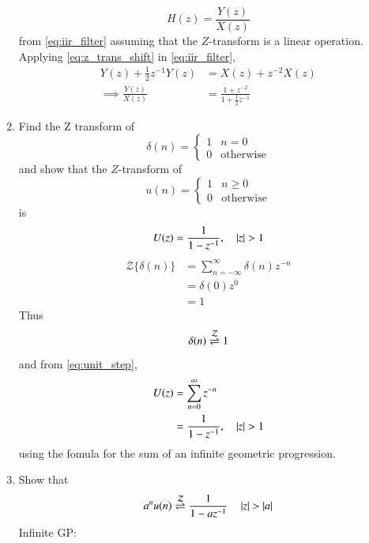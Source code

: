 \documentclass[journal,12pt,twocolumn]{IEEEtran}
\renewcommand\thesection{\arabic{section}}
\begin{document}
\begin{enumerate}[label=\thesection.\arabic*]
%
\begin{equation}
H(z) = \frac{Y(z)}{X(z)}
\end{equation}
%
from  \eqref{eq:iir_filter} assuming that the $Z$-transform is a linear operation.
\\
\solution  Applying \eqref{eq:z_trans_shift} in \eqref{eq:iir_filter},
\begin{align}
Y(z) + \frac{1}{2}z^{-1}Y(z) &= X(z)+z^{-2}X(z)
\\
\implies \frac{Y(z)}{X(z)} &= \frac{1 + z^{-2}}{1 + \frac{1}{2}z^{-1}}
\label{eq:freq_resp}
\end{align}
%
\item Find the Z transform of 
\begin{equation}
\delta(n)
=
\begin{cases}
1 & n = 0
\\
0 & \text{otherwise}
\end{cases}
\end{equation}
and show that the $Z$-transform of
\begin{equation}
\label{eq:unit_step}
u(n)
=
\begin{cases}
1 & n \ge 0
\\
0 & \text{otherwise}
\end{cases}
\end{equation}
is
\begin{equation}
U(z) = \frac{1}{1-z^{-1}}, \quad \left\vert z\right\vert > 1
\end{equation}
\solution
\begin{align}
{\mathcal {Z}}\{\delta(n)\} &=\sum _{n=-\infty }^{\infty }\delta(n)z^{-n}
\\
&= \delta(0)z^{0}
\\
&= 1
\end{align}
Thus
\begin{equation}
\delta(n) \overset{\mathcal{Z}}{ \rightleftharpoons} 1
\end{equation}
and from \eqref{eq:unit_step},
\begin{align}
U(z) &= \sum _{n= 0}^{\infty}z^{-n}
\\
&=\frac{1}{1-z^{-1}}, \quad \left\vert z\right\vert > 1
\end{align}
using the fomula for the sum of an infinite geometric progression.
%
\bigskip
\item Show that 
\begin{equation}
\label{eq:anun}
a^nu(n) \overset{\mathcal{Z}}{ \rightleftharpoons} \frac{1}{1-az^{-1}} \quad \left\vert z\right\vert > \left\vert a\right\vert
\end{equation}
\solution
Infinite GP:
\begin{align}

\end{align}
\end{enumerate}
\end{document}
